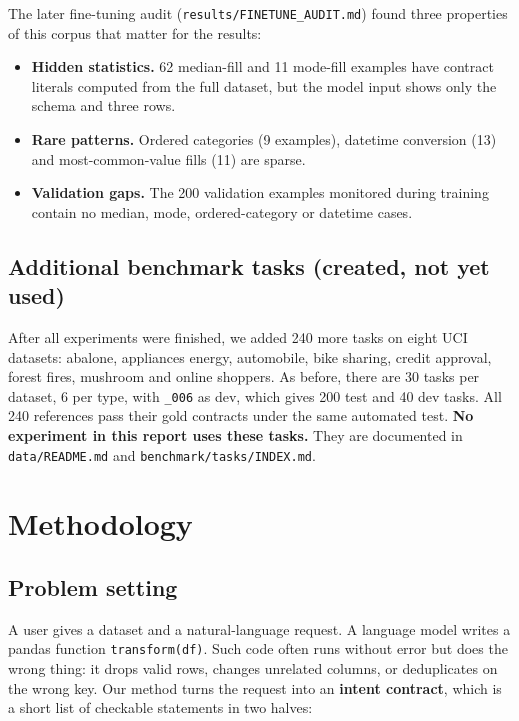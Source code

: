 \documentclass[11pt]{article}
\providecommand{\tightlist}{\setlength{\itemsep}{0pt}\setlength{\parskip}{0pt}}
\begin{document}
The later fine-tuning audit
(\texttt{results/\allowbreak{}FINETUNE\_\allowbreak{}AUDIT.\allowbreak{}md})
found three properties of this corpus that matter for the results:

\begin{itemize}
\tightlist
\item
  \textbf{Hidden statistics.} 62 median-fill and 11 mode-fill examples
  have contract literals computed from the full dataset, but the model
  input shows only the schema and three rows.
\item
  \textbf{Rare patterns.} Ordered categories (9 examples), datetime
  conversion (13) and most-common-value fills (11) are sparse.
\item
  \textbf{Validation gaps.} The 200 validation examples monitored during
  training contain no median, mode, ordered-category or datetime cases.
\end{itemize}

\subsection{Additional benchmark tasks (created, not yet used)}

After all experiments were finished, we added 240 more tasks on eight
UCI datasets: abalone, appliances energy, automobile, bike sharing,
credit approval, forest fires, mushroom and online shoppers. As before,
there are 30 tasks per dataset, 6 per type, with
\texttt{\_\allowbreak{}006} as dev, which gives 200 test and 40 dev
tasks. All 240 references pass their gold contracts under the same
automated test. \textbf{No experiment in this report uses these tasks.}
They are documented in \texttt{data/\allowbreak{}README.\allowbreak{}md}
and
\texttt{benchmark/\allowbreak{}tasks/\allowbreak{}INDEX.\allowbreak{}md}.

\section{Methodology}

\subsection{Problem setting}

A user gives a dataset and a natural-language request. A language model
writes a pandas function \texttt{transform(df)}. Such code often runs
without error but does the wrong thing: it drops valid rows, changes
unrelated columns, or deduplicates on the wrong key. Our method turns
the request into an \textbf{intent contract}, which is a short list of
checkable statements in two halves:
\end{document}
